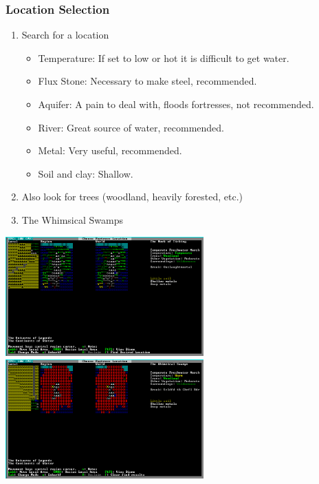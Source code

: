 \begin{frame}[fragile]
\frametitle{Location Selection}
\begin{enumerate}
\item Search for a location
\begin{itemize}
	\item Temperature: If set to low or hot it is difficult to get water.
	\item Flux Stone: Necessary to make steel, recommended.
	\item Aquifer: A pain to deal with, floods fortresses, not recommended.
	\item River: Great source of water, recommended.
	\item Metal: Very useful, recommended.
	\item Soil and clay: Shallow.
\end{itemize}
\item Also look for trees (woodland, heavily forested, etc.)
\item The Whimsical Swamps
\end{enumerate}
\end{frame}
\begin{frame}[fragile]
\includegraphics[width=3in]{img/location1}\\
\includegraphics[width=3in]{img/location2}
\end{frame}

